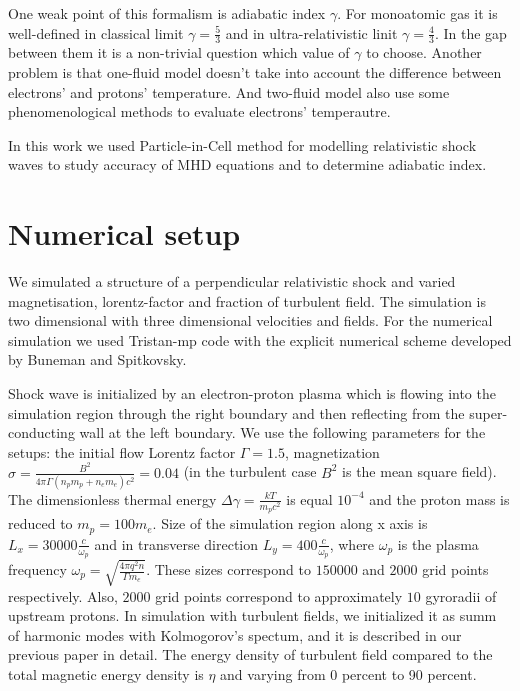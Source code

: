 \documentclass[a4paper]{jpconf}
\begin{document}
One weak point of this formalism is adiabatic index $\gamma$. For monoatomic gas it is well-defined in classical limit $\gamma = \frac{5}{3}$ and in ultra-relativistic linit $\gamma = \frac{4}{3}$. In the gap between them it is a non-trivial question which value of $\gamma$ to choose. Another problem is that one-fluid model doesn't take into account the difference between electrons' and protons' temperature. And two-fluid model also use some phenomenological methods to evaluate electrons' temperautre.

In this work we used Particle-in-Cell method for modelling relativistic shock waves to study accuracy of MHD equations and to determine adiabatic index.


\section{Numerical setup}
We simulated a structure of a perpendicular relativistic shock and varied magnetisation, lorentz-factor and fraction of turbulent field. 
The simulation is two dimensional with three dimensional velocities and fields. For the numerical simulation we used Tristan-mp code with the explicit numerical scheme developed by Buneman \cite{Buneman93} and  Spitkovsky\cite{Spitkovsky2005}.

Shock wave is initialized by an electron-proton plasma which is flowing into the simulation region through the right boundary and then reflecting from the super-conducting wall at the left boundary. We use the following parameters for the setups: the initial flow Lorentz factor $\Gamma = 1.5$, magnetization $\sigma = \frac{B^2}{4\pi\Gamma (n_p m_p + n_e m_e) c^2} = 0.04$ (in the turbulent case $B^2$ is the mean square field). The dimensionless thermal energy $\Delta \gamma = \frac{k T}{m_p c^2}$ is equal $10^{-4}$ and the proton mass is reduced to $m_p = 100 m_e$. Size of the simulation region along x axis is $L_x = 30000\frac{c}{\omega_p}$ and in transverse direction $L_y = 400\frac{c}{\omega_p}$, where $\omega_p$ is the plasma frequency $\omega_p = \sqrt{\frac{4\pi q^2 n}{\Gamma m_e}}$. These sizes correspond to $150000$ and $2000$ grid points respectively. Also, $2000$ grid points correspond to approximately $10$ gyroradii of upstream protons.
In simulation with turbulent fields, we initialized it as summ of harmonic modes with Kolmogorov's spectum, and it is described in our previous paper in detail\cite{Romansky2019}. The energy density of turbulent field compared to the total magnetic energy density is $\eta$ and varying from 0 percent to 90 percent.
\end{document}
